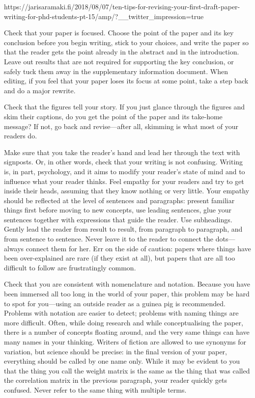 
https://jarisaramaki.fi/2018/08/07/ten-tips-for-revising-your-first-draft-paper-writing-for-phd-students-pt-15/amp/?\_\_twitter\_impression=true

Check that your paper is focused. Choose the point of the paper and its key conclusion before you begin writing, stick to your choices, and write the paper so that the reader gets the point already in the abstract and in the introduction. Leave  out results that are not required for supporting the key conclusion, or safely tuck them away in the supplementary information document. When editing, if you feel that your paper loses its focus at some point, take a step back and do a major rewrite.

Check that the figures tell your story. If you just glance through the figures and skim their captions, do you get the point of the paper and its take-home message? If not, go back and revise—after all, skimming is what most of your readers do.

Make sure that you take the reader’s hand and lead her through the text with signposts. Or, in other words, check that your writing is not confusing. Writing is, in part, psychology, and it aims to modify your reader’s state of mind and to influence what your reader thinks. Feel empathy for your readers and try to get inside their heads, assuming that they know nothing or very little. Your empathy should be reflected at the level of sentences and paragraphs: present familiar things first before moving to new concepts, use leading sentences, glue your sentences together with expressions that guide the reader. Use subheadings. Gently lead the reader from result to result, from paragraph to paragraph, and from sentence to sentence. Never leave it to the reader to connect the dots— always connect them for her. Err on the side of caution: papers where things have been over-explained are rare (if they exist at all), but papers that are all too difficult to follow are frustratingly common.

Check that you are consistent with nomenclature and notation. Because you have been immersed all too long in the world of your paper, this problem may be hard to spot for you—using an outside reader as a guinea pig is recommended. Problems with notation are easier to detect; problems with naming things are more difficult. Often, while doing research and while conceptualising the paper, there is a number of concepts floating around, and the very same things can have many names in your thinking. Writers of fiction are allowed to use synonyms for variation, but science should be precise: in the final version of your paper, everything should be called by one name only. While it may be evident to you that the thing you call the weight matrix is the same as the thing that was called the correlation matrix in the previous paragraph, your reader quickly gets confused. Never refer to the same thing with multiple terms.


